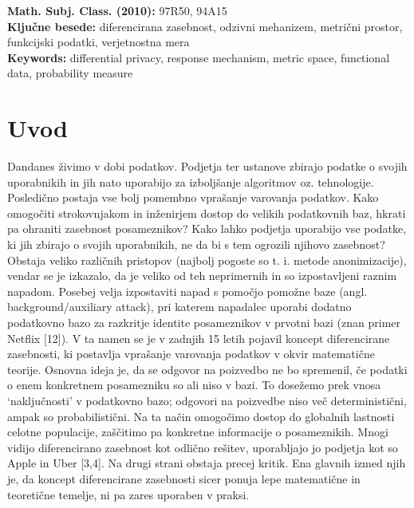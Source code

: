 \documentclass[12pt,a4paper]{amsart}
\theoremstyle{definition} %
\theoremstyle{plain} %
\begin{document}
\vfill\noindent
{\bf Math. Subj. Class. (2010):} 97R50, 94A15  \\[1mm]  
{\bf Ključne besede:} diferencirana zasebnost, odzivni mehanizem, metrični prostor, funkcijski podatki, verjetnostna mera  \\[1mm]  
{\bf Keywords:} differential privacy, response mechanism, metric space, functional data, probability measure
\pagebreak



\section{Uvod}
Dandanes živimo v dobi podatkov. Podjetja ter ustanove zbirajo podatke o svojih uporabnikih in jih nato uporabijo za izboljšanje algoritmov oz. tehnologije. Posledično postaja vse bolj pomembno  vprašanje  varovanja podatkov. Kako omogočiti strokovnjakom in inženirjem dostop do velikih podatkovnih baz, hkrati pa ohraniti zasebnost posameznikov? Kako lahko podjetja uporabijo vse podatke, ki jih zbirajo o svojih uporabnikih, ne da bi s tem ogrozili njihovo zasebnost? Obstaja veliko različnih pristopov (najbolj pogoste so t. i. metode anonimizacije), vendar se je izkazalo, da je veliko od teh neprimernih in so izpostavljeni raznim napadom. Posebej velja izpostaviti napad s pomočjo pomožne baze (angl. background/auxiliary attack), pri katerem napadalec uporabi dodatno podatkovno bazo za razkritje identite posameznikov v prvotni bazi (znan primer Netflix [12]).  V ta namen se je v zadnjih 15 letih pojavil koncept diferencirane zasebnosti, ki postavlja vprašanje varovanja podatkov v okvir matematične teorije.  Osnovna ideja je, da se odgovor na poizvedbo ne bo spremenil, če podatki o enem konkretnem posamezniku so ali niso v bazi. To dosežemo prek vnosa `naključnosti' v podatkovno bazo; odgovori na poizvedbe niso več deterministični, ampak so probabilistični. Na ta način omogočimo dostop do globalnih lastnosti celotne populacije, zaščitimo pa konkretne informacije o posameznikih. Mnogi vidijo diferencirano zasebnost kot odlično rešitev, uporabljajo jo podjetja kot so Apple in Uber [3,4]. Na drugi strani obstaja precej kritik. Ena glavnih izmed njih je, da koncept diferencirane zasebnosti sicer ponuja lepe matematične in teoretične temelje, ni pa zares uporaben v praksi. 
\newline
\newline
\end{document}
